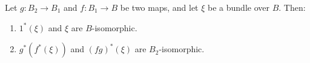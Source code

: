 Let $g: B_2 \to B_1$ and $f: B_1 \to B$ be two maps, and let $\xi$ be a bundle over $B$. Then:
\begin{enumerate}
\item $1^*(\xi)$ and $\xi$ are $B$-isomorphic.
\item $g^*(f^*(\xi))$ and $(fg)^*(\xi)$ are $B_2$-isomorphic.
\end{enumerate}

